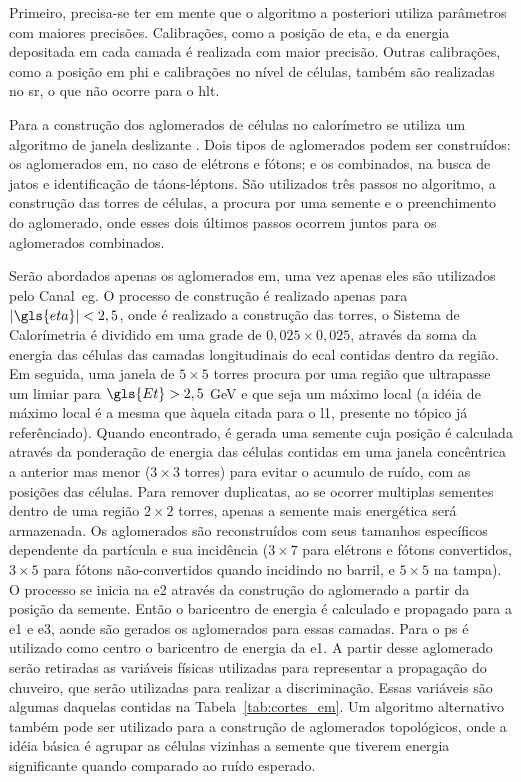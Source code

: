 Primeiro, precisa-se ter em mente que o algoritmo a posteriori utiliza
parâmetros com maiores precisões. Calibrações, como a posição de \gls{eta}, e 
da energia depositada em cada camada é realizada com maior precisão. Outras
calibrações, como a posição em \gls{phi} e calibrações no nível de células,
também são realizadas no \gls{sr}, o que não ocorre para o \gls{hlt}.

Para a construção dos aglomerados de células no calorímetro se utiliza um algoritmo 
de janela deslizante \cite{sliding_window}.
Dois tipos de aglomerados podem ser construídos: os aglomerados \gls{em}, no caso de elétrons e fótons; 
e os combinados, na busca de jatos e identificação de
táons-léptons. São utilizados três passos no algoritmo, a construção das torres de
células, a procura por uma semente e o preenchimento do aglomerado, onde esses dois
últimos passos ocorrem juntos para os aglomerados combinados. 

Serão abordados apenas os aglomerados \gls{em}, uma vez apenas eles são
utilizados pelo Canal~\gls{eg}. O processo de construção é realizado apenas para 
$|\gls{eta}|<2,5$, onde é realizado a construção das torres, o Sistema de Calorímetria é 
dividido em uma grade de $0,025\times0,025$, através da soma da energia das
células das camadas longitudinais do \gls{ecal} contidas dentro da
região. Em seguida, uma janela de $5\times5$ torres
procura por uma região que ultrapasse um limiar para $\gls{Et} > 2,5$ GeV e 
que seja um máximo local (a idéia de máximo local é a mesma que àquela citada
para o \gls{l1}, presente no tópico já referênciado). Quando encontrado, é gerada uma
semente cuja posição é calculada através da ponderação de energia das células contidas 
em uma janela concêntrica a anterior mas menor ($3\times3$ torres) para evitar o
acumulo de ruído, com as posições das células.
Para remover duplicatas, ao se ocorrer multiplas sementes dentro de uma região
$2\times2$ torres, apenas a semente mais energética será armazenada. Os
aglomerados são reconstruídos com seus tamanhos 
específicos dependente da partícula e sua incidência ($3\times7$ para elétrons e fótons convertidos,
$3\times5$ para fótons não-convertidos quando incidindo no barril, e $5\times5$ na
tampa). O processo se inicia na \gls{e2} através da construção do
aglomerado a partir da posição da semente. Então o baricentro de energia é
calculado e propagado para a \gls{e1} e \gls{e3}, aonde são gerados os
aglomerados para essas camadas. Para o \gls{ps} é utilizado como centro o
baricentro de energia da \gls{e1}. A partir desse aglomerado serão retiradas 
as variáveis físicas utilizadas para representar a propagação do chuveiro, que
serão utilizadas para realizar a discriminação. Essas variáveis são algumas
daquelas contidas na Tabela~\ref{tab:cortes_em}.  
Um algoritmo alternativo também pode ser utilizado para a construção
de aglomerados topológicos, onde a idéia básica é agrupar as células 
vizinhas a semente que tiverem energia significante quando comparado ao ruído
esperado.

